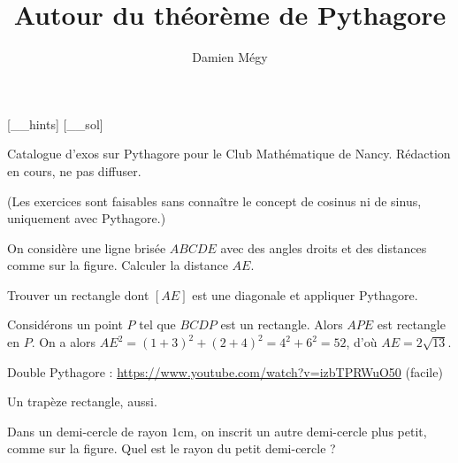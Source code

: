 




[_\jobname_hints]
[_\jobname_sol]


\title{Autour du théorème de Pythagore}
\author{Damien Mégy}
\maketitle

Catalogue d'exos sur Pythagore pour le Club Mathématique de Nancy. Rédaction en cours, ne pas diffuser.


(Les exercices sont faisables sans connaître le concept de cosinus ni de sinus, uniquement avec Pythagore.)



\begin{exo}
On considère une ligne brisée $ABCDE$ avec des angles droits et des distances comme sur la figure.
Calculer la distance $AE$.
\begin{center}
\end{center}
\begin{hint}
Trouver un rectangle dont $[AE]$ est une diagonale et appliquer Pythagore.
\end{hint}
\begin{sol}
Considérons un point $P$ tel que $BCDP$ est un rectangle. Alors $APE$ est rectangle en $P$.
On a alors $AE^2 = (1+3)^2+(2+4)^2=4^2+6^2=52$, d'où $AE=2\sqrt{13}$.
\end{sol}
\end{exo}

Double Pythagore : \url{https://www.youtube.com/watch?v=izbTPRWuO50} (facile)

Un trapèze rectangle, aussi.

\begin{exo}
Dans un demi-cercle de rayon $1$cm, on inscrit un autre demi-cercle plus petit, comme sur la figure.
Quel est le rayon du petit demi-cercle ?
\begin{center}
\end{center}
\end{exo}




